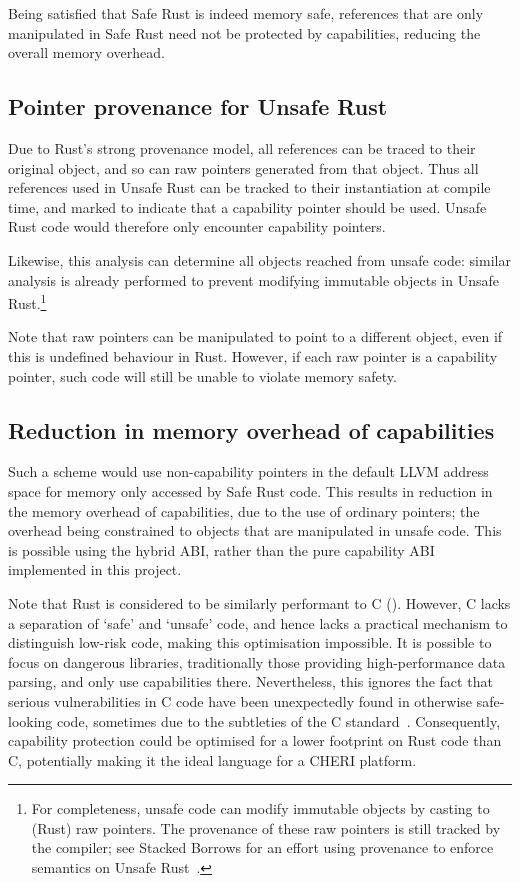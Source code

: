 \documentclass[dissertation.tex]{subfiles}
\begin{document}
Being satisfied that Safe Rust is indeed memory safe, references that
are only manipulated in Safe Rust need not be protected by capabilities,
reducing the overall memory overhead.


\subsection{Pointer provenance for Unsafe Rust}
Due to Rust's strong provenance model, all references can be traced to
their original object, and so can raw pointers generated from that
object.
Thus all references used in Unsafe Rust can be tracked to their
instantiation at compile time, and marked to indicate that a capability
pointer should be used.
Unsafe Rust code would therefore only encounter capability pointers.

Likewise, this analysis can determine all objects reached from unsafe
code: similar analysis is already performed to prevent modifying
immutable objects in Unsafe Rust.\footnote{
For completeness, unsafe code can modify immutable objects by casting to
(Rust) raw pointers.
The provenance of these raw pointers is still tracked by the compiler;
see Stacked Borrows for an effort using provenance to enforce semantics
on Unsafe Rust~\cite{rust-stacked-borrows}.
}

Note that raw pointers can be manipulated to point to a different
object, even if this is undefined behaviour in Rust.
However, if each raw pointer is a capability pointer, such code will
still be unable to violate memory safety.


\subsection{Reduction in memory overhead of capabilities}
Such a scheme would use non-capability pointers in the default LLVM
address space for memory only accessed by Safe Rust code.
This results in reduction in the memory overhead of capabilities, due to
the use of ordinary pointers; the overhead being constrained to objects
that are manipulated in unsafe code.
This is possible using the hybrid ABI, rather than the pure capability
ABI implemented in this project.

Note that Rust is considered to be similarly performant to C
().
However, C lacks a separation of `safe' and `unsafe' code, and hence
lacks a practical mechanism to distinguish low-risk code, making this
optimisation impossible.
It is possible to focus on dangerous libraries, traditionally those
providing high-performance data parsing, and only use capabilities
there.
Nevertheless, this ignores the fact that serious vulnerabilities in C code
have been unexpectedly found in otherwise safe-looking code, sometimes
due to the subtleties of the C standard~\cite{memarian2016cdepths}.
Consequently, capability protection could be optimised for a lower
footprint on Rust code than C, potentially making it the ideal language
for a CHERI platform.
\end{document}
